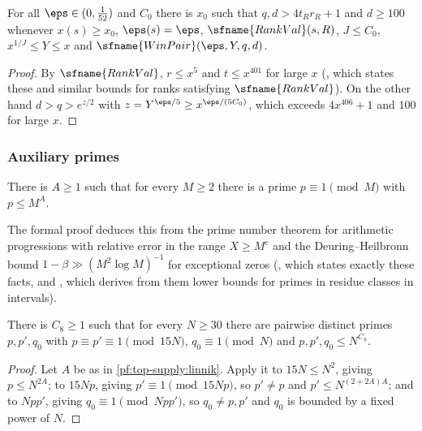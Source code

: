 \begin{lemma}\label{pf:top-supply:qdbig}
For all $\eps\in(0,\frac1{52})$ and $C_0$ there is $x_0$ such that $q,d>4t_Rr_R+1$ and $d\ge100$ whenever $x(s)\ge x_0$,
$\eps(s)=\eps$, $\sfname{RankVal}(s,R)$, $J\le C_0$, $x^{1/J}\le Y\le x$ and $\sfname{WinPair}(\eps,Y,q,d)$.
\end{lemma}

\begin{proof}
By $\sfname{RankVal}$, $r\le x^5$ and $t\le x^{401}$ for large $x$ (, which
states these and similar bounds for ranks satisfying $\sfname{RankVal}$). On the other hand $d>q>e^{z/2}$ with
$z=Y^{\eps/5}\ge x^{\eps/(5C_0)}$, which exceeds $4x^{406}+1$ and $100$ for large $x$.
\end{proof}

\subsubsection{Auxiliary primes}

\begin{littheorem}\label{pf:top-supply:linnik}
There is $A\ge1$ such that for every $M\ge2$ there is a prime $p\equiv1\pmod M$ with $p\le M^A$.
  
\end{littheorem}

The formal proof deduces this from the prime number theorem for arithmetic progressions with relative error in the range
$X\ge M^{c}$ and the Deuring--Heilbronn bound $1-\beta\gg(M^2\log M)^{-1}$ for exceptional zeros
(, which states exactly these facts, and
, which derives from them lower bounds for primes in residue
classes in intervals).

\begin{lemma}\label{pf:top-supply:threeprimes}
There is $C_8\ge1$ such that for every $N\ge30$ there are pairwise distinct primes $p,p',q_0$ with
$p\equiv p'\equiv1\pmod{15N}$, $q_0\equiv1\pmod N$ and $p,p',q_0\le N^{C_8}$.
\end{lemma}

\begin{proof}
Let $A$ be as in \cref{pf:top-supply:linnik}. Apply it to $15N\le N^2$, giving $p\le N^{2A}$; to $15Np$, giving
$p'\equiv1\pmod{15Np}$, so $p'\ne p$ and $p'\le N^{(2+2A)A}$; and to $Npp'$, giving $q_0\equiv1\pmod{Npp'}$, so
$q_0\ne p,p'$ and $q_0$ is bounded by a fixed power of $N$.
\end{proof}


